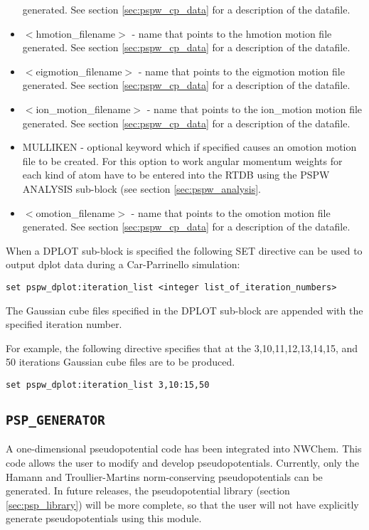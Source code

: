 \begin{itemize}
                                generated. See section \ref{sec:pspw_cp_data} for a 
                                description of the datafile.
        \item $<$hmotion\_filename$>$ - name that points to the hmotion motion file
                                generated. See section \ref{sec:pspw_cp_data} for a 
                                description of the datafile.
        \item $<$eigmotion\_filename$>$ - name that points to the eigmotion motion file
                                generated. See section \ref{sec:pspw_cp_data} for a 
                                description of the datafile.
        \item $<$ion\_motion\_filename$>$ - name that points to the ion\_motion motion file
                                generated. See section \ref{sec:pspw_cp_data} for a 
                                description of the datafile.
       \item MULLIKEN - optional keyword which if specified
                         causes an omotion motion file to be created.  For this option
                         to work angular momentum weights for each kind
                         of atom have to be entered into the RTDB using
                         the PSPW ANALYSIS sub-block (see section \ref{sec:pspw_analysis}.
        \item $<$omotion\_filename$>$ - name that points to the omotion motion file
                                generated. See section \ref{sec:pspw_cp_data} for a 
                                description of the datafile.
\end{itemize}

When a DPLOT sub-block is specified the following SET directive can be used 
to output dplot data during a Car-Parrinello simulation:
\begin{verbatim}
set pspw_dplot:iteration_list <integer list_of_iteration_numbers>
\end{verbatim}
The Gaussian cube files specified in the DPLOT sub-block are appended
with the specified iteration number. 

For example, the following directive specifies that at the 
3,10,11,12,13,14,15, and 50 iterations Gaussian cube files are to be produced.

\begin{verbatim}
set pspw_dplot:iteration_list 3,10:15,50
\end{verbatim}


\subsection{\tt PSP\_GENERATOR}
\label{sec:pspw_psp_generator}
A one-dimensional pseudopotential code has been integrated into NWChem.
This code allows the user to modify and develop pseudopotentials.  Currently, 
only the Hamann and Troullier-Martins norm-conserving pseudopotentials can be
generated.  In future releases, the pseudopotential library (section \ref{sec:psp_library})
will be more complete, so that the user will not have explicitly generate
pseudopotentials using this module.

